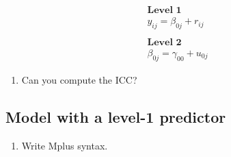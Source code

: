 \documentclass[
]{book}
\providecommand{\tightlist}{%
  \setlength{\itemsep}{0pt}\setlength{\parskip}{0pt}}
\begin{document}
\[
\begin{gathered}
\textbf{Level 1} \\ 
y_{ij}=\beta_{0j} + r_{ij} \\ \\
\textbf{Level 2} \\ 
\beta_{0j}=\gamma_{00} + u_{0j}
\end{gathered}
\]

\begin{enumerate}
\def\labelenumi{\arabic{enumi}.}
\setcounter{enumi}{3}
\tightlist
\item
  Can you compute the ICC?
\end{enumerate}

\hypertarget{model-with-a-level-1-predictor}{%
\subsection{Model with a level-1 predictor}\label{model-with-a-level-1-predictor}}

\begin{enumerate}
\def\labelenumi{\arabic{enumi}.}
\tightlist
\item
  Write Mplus syntax.
\end{enumerate}
\end{document}
